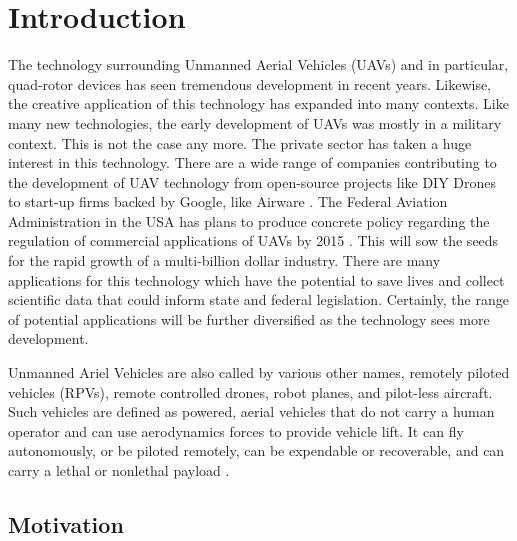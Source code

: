 
\chapter{Introduction} %

\label{Introduction} %



The technology surrounding Unmanned Aerial Vehicles (UAVs) and in particular, quad-rotor devices has seen tremendous development in recent years. Likewise, the creative application of this technology has expanded into many contexts. Like many new technologies, the early development of UAVs was mostly in a military context. This is not the case any more. The private sector has taken a huge interest in this technology. There are a wide range of companies contributing to the development of UAV technology from open-source projects like DIY Drones \cite{diydrones} to start-up firms backed by Google, like Airware \cite{airware}.  The Federal Aviation Administration in the USA has plans to produce concrete policy regarding the regulation of commercial applications of UAVs by 2015 \cite{faa}. This will sow the seeds for the rapid growth of a multi-billion dollar industry. There are many applications for this technology which have the potential to save lives and collect scientific data that could inform state and federal legislation. Certainly, the range of potential applications will be further diversified as the technology sees more development. 

Unmanned Ariel Vehicles are also called by various other names, remotely piloted vehicles (RPVs), remote controlled drones, robot planes, and pilot-less aircraft. Such vehicles are defined as powered, aerial vehicles that do not carry a human operator and can use aerodynamics forces to provide vehicle lift. It can fly autonomously, or be piloted remotely, can be expendable or recoverable, and can carry a lethal or nonlethal payload \cite{bone2004unmanned}.


\section{Motivation}

